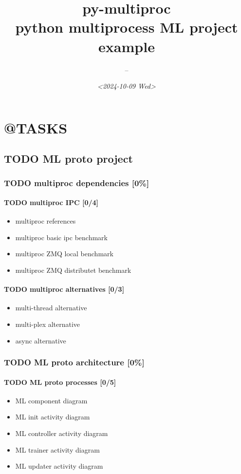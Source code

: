\documentclass[10pt,a4paper]{article}
\author{--}
\date{\textit{<2024-10-09 Wed>}}
\title{py-multiproc\\\medskip
\large python multiprocess ML project example}
\begin{document}
\maketitle
\tableofcontents


\section{@TASKS}
\label{sec:orge35a72d}
\subsection{{\bfseries\sffamily TODO} ML proto project}
\label{sec:org5703758}
\subsubsection{{\bfseries\sffamily TODO} multiproc dependencies [0\%]}
\label{sec:org229ae5c}
\paragraph{{\bfseries\sffamily TODO} multiproc IPC [0/4]}
\label{sec:org85fd089}
\begin{itemize}
\item[{$\square$}] multiproc references
\item[{$\square$}] multiproc basic ipc benchmark
\item[{$\square$}] multiproc ZMQ local benchmark
\item[{$\square$}] multiproc ZMQ distributet benchmark
\end{itemize}
\paragraph{{\bfseries\sffamily TODO} multiproc alternatives [0/3]}
\label{sec:orgf2d83d4}
\begin{itemize}
\item[{$\square$}] multi-thread alternative
\item[{$\square$}] multi-plex alternative
\item[{$\square$}] async alternative
\end{itemize}
\subsubsection{{\bfseries\sffamily TODO} ML proto architecture [0\%]}
\label{sec:orgd60b64e}
\paragraph{{\bfseries\sffamily TODO} ML proto processes [0/5]}
\label{sec:org2ed97d9}
\begin{itemize}
\item[{$\square$}] ML component diagram
\item[{$\square$}] ML init activity diagram
\item[{$\square$}] ML controller activity diagram
\item[{$\square$}] ML trainer activity diagram
\item[{$\square$}] ML updater activity diagram
\end{itemize}
\end{document}

